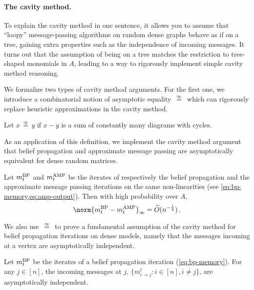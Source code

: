\documentclass[12pt]{article}
\newcommand{\eqinf}{\,\overset{\infty}{=}\,}
\begin{document}
\vspace{-8pt}
\paragraph{The cavity method.} To explain the cavity method in one sentence, it allows you to assume
that ``loopy'' message-passing algorithms
on random dense graphs behave as if on a tree, gaining extra properties such as the independence of incoming messages.
It turns out that the assumption of being on a tree matches the restriction to tree-shaped monomials in $A$, leading to a way to rigorously implement
simple cavity method reasoning.

We formalize two types of cavity method arguments. For the first one, we introduce
a combinatorial notion of asymptotic equality $\eqinf$
which can rigorously replace heuristic approximations in the cavity method.

\begin{definition}[$\eqinf$, informal version of \cref{def:asymptotic-equality}]
    Let $x \eqinf y$ if $x-y$ is a sum of constantly many diagrams with cycles.
\end{definition}

As an application of this definition, we implement the cavity method argument
that belief propagation and approximate message passing are asymptotically equivalent for dense random matrices.

\begin{theorem}\label{thm:bp-amp-intro}
    Let $m_{t}^{\textnormal{BP}}$ and $m_t^{\textnormal{AMP}}$ be the iterates
    of respectively the belief propagation
    and the approximate message passing iterations on the same non-linearities (see \cref{eq:bp-memory,eq:amp-output}). Then with high probability over $A$,
    \begin{align*}
        \norm{m_{t}^{\textnormal{BP}} - m_t^{\textnormal{AMP}}}_\infty = \widetilde{O}(n^{-\frac 12})\,.
    \end{align*}
\end{theorem}

We also use $\eqinf$ to prove a fundamental
assumption of the cavity method for belief
propagation iterations on dense models, 
namely that
the messages incoming at a vertex
are asymptotically independent.

\begin{theorem}
    Let $m_t^{\textnormal{BP}}$ be the iterates
    of a belief propagation iteration
    (\cref{eq:bp-memory}). For any $j\in [n]$, the incoming messages
    at $j$, $\{m^t_{i\to j}:i\in [n],i\neq j\}$, are
    asymptotically independent.
\end{theorem}
\end{document}
